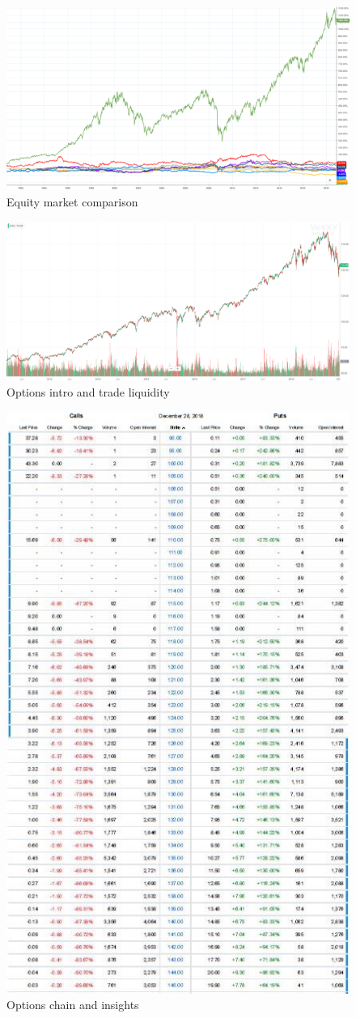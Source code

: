 \documentclass{article}
\begin{document}
\vspace{10pt}

\begin{figure}[!htb]
    \centering
    \includegraphics[width=\textwidth]{imgs/22.png}
    \caption{Equity market comparison}
\end{figure}

\vspace{10pt}

\begin{figure}[!htb]
    \centering
    \includegraphics[width=\textwidth]{imgs/23.png}
    \caption{Options intro and trade liquidity}
\end{figure}

\vspace{10pt}

\begin{figure}[!htb]
    \centering
    \includegraphics[width=.42\textwidth]{imgs/24.png}
    \caption{Options chain and insights}
\end{figure}
\end{document}
